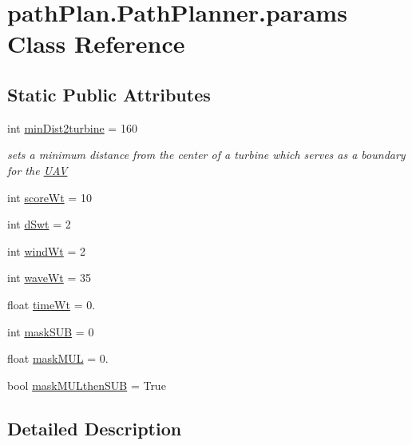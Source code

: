 \hypertarget{classpath_plan_1_1_path_planner_1_1params}{}\section{path\+Plan.\+Path\+Planner.\+params Class Reference}
\label{classpath_plan_1_1_path_planner_1_1params}
\subsection*{Static Public Attributes}
\begin{DoxyCompactItemize}
\item 
int \mbox{\hyperlink{classpath_plan_1_1_path_planner_1_1params_ab5036cf066233e60ad8258c362ada05c}{min\+Dist2turbine}} = 160
\begin{DoxyCompactList}\small\item\em sets a minimum distance from the center of a turbine which serves as a boundary for the \mbox{\hyperlink{classpath_plan_1_1_u_a_v}{U\+AV}} \end{DoxyCompactList}\item 
int \mbox{\hyperlink{classpath_plan_1_1_path_planner_1_1params_aad301e820ffa702be40637624c53002e}{score\+Wt}} = 10
\item 
int \mbox{\hyperlink{classpath_plan_1_1_path_planner_1_1params_a4c0936619310ce06a72da3fd0f10be91}{d\+Swt}} = 2
\item 
int \mbox{\hyperlink{classpath_plan_1_1_path_planner_1_1params_a959f9bbd960b26286d9443ff5fbc9be2}{wind\+Wt}} = 2
\item 
int \mbox{\hyperlink{classpath_plan_1_1_path_planner_1_1params_a06b10836f0ea2b68ee28d8f93968b531}{wave\+Wt}} = 35
\item 
float \mbox{\hyperlink{classpath_plan_1_1_path_planner_1_1params_acd6712f4dbcb4cfa3016c0a850930013}{time\+Wt}} = 0.
\item 
int \mbox{\hyperlink{classpath_plan_1_1_path_planner_1_1params_a0d026c08bb4536940e76a44f7ced0449}{mask\+S\+UB}} = 0
\item 
float \mbox{\hyperlink{classpath_plan_1_1_path_planner_1_1params_a9d70c805ce863e0b680c0d168a5fd017}{mask\+M\+UL}} = 0.
\item 
bool \mbox{\hyperlink{classpath_plan_1_1_path_planner_1_1params_a08e4e25b445993b387b593b4942489e1}{mask\+M\+U\+Lthen\+S\+UB}} = True
\end{DoxyCompactItemize}


\subsection{Detailed Description}



